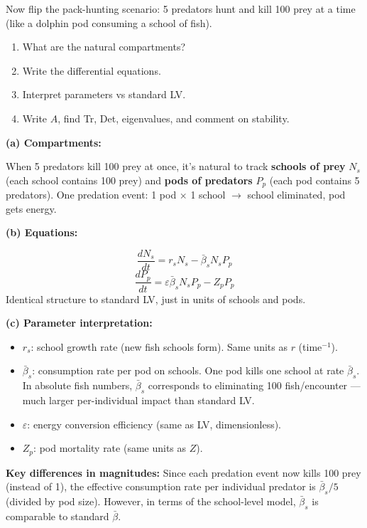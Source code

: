 \documentclass[10pt]{article}
\begin{document}
\begin{problem}
Now flip the pack-hunting scenario: 5 predators hunt and kill 100 prey at a time (like a dolphin pod consuming a school of fish).
\begin{enumerate}[label=(\alph*)]
\item What are the natural compartments?
\item Write the differential equations.
\item Interpret parameters vs standard LV.
\item Write $A$, find Tr, Det, eigenvalues, and comment on stability.
\end{enumerate}
\end{problem}

\begin{solution}
\textbf{(a) Compartments:}

When 5 predators kill 100 prey at once, it's natural to track \textbf{schools of prey} $N_s$ (each school contains 100 prey) and \textbf{pods of predators} $P_p$ (each pod contains 5 predators). One predation event: 1 pod $\times$ 1 school $\to$ school eliminated, pod gets energy.

\medskip\textbf{(b) Equations:}

\[
\frac{dN_s}{dt} = r_s N_s - \bar\beta_s N_s P_p
\]
\[
\frac{dP_p}{dt} = \varepsilon\bar\beta_s N_s P_p - Z_p P_p
\]
Identical structure to standard LV, just in units of schools and pods.

\medskip\textbf{(c) Parameter interpretation:}

\begin{itemize}
\item $r_s$: school growth rate (new fish schools form). Same units as $r$ (time$^{-1}$).
\item $\bar\beta_s$: consumption rate per pod on schools. One pod kills one school at rate $\bar\beta_s$. In absolute fish numbers, $\bar\beta_s$ corresponds to eliminating 100 fish/encounter — much larger per-individual impact than standard LV.
\item $\varepsilon$: energy conversion efficiency (same as LV, dimensionless).
\item $Z_p$: pod mortality rate (same units as $Z$).
\end{itemize}

\textbf{Key differences in magnitudes:} Since each predation event now kills 100 prey (instead of 1), the effective consumption rate per individual predator is $\bar\beta_s/5$ (divided by pod size). However, in terms of the school-level model, $\bar\beta_s$ is comparable to standard $\bar\beta$.


\end{solution}
\end{document}
